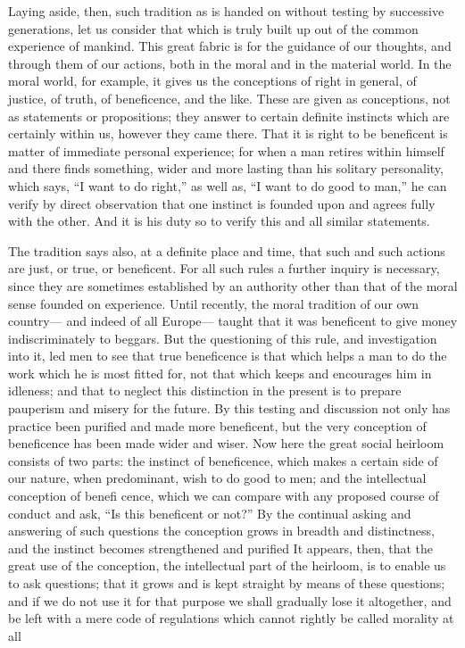 \documentclass[12pt]{article}
\begin{document}
Laying aside, then, such tradition as is handed on without testing by successive generations, let us consider that which is truly built up out of the common experience of mankind. This great fabric is for the guidance of our thoughts, and through them of our actions, both in the moral and in the material world. In the moral world, for example, it gives us the conceptions of right in general, of justice, of truth, of beneficence, and the like. These are given as conceptions, not as statements or propositions; they answer to certain definite instincts which are certainly within us, however they came there. That it is right to be beneficent is matter of immediate personal experience; for when a man retires within himself and there finds something, wider and more lasting than his solitary personality, which says, ``I want to do right,'' as well as, ``I want to do good to man,'' he can verify by direct observation that one instinct is founded upon and agrees fully with the other. And it is his duty so to verify this and all similar statements.

The tradition says also, at a definite place and time, that such and such actions are just, or true, or beneficent. For all such rules a further inquiry is necessary, since they are sometimes established by an authority other than that of the moral sense founded on experience. Until recently, the moral tradition of our own country--- and indeed of all Europe--- taught that it was beneficent to give money indiscriminately to beggars. But the questioning of this rule, and investigation into it, led men to see that true beneficence is that which helps a man to do the work which he is most fitted for, not that which keeps and encourages him in idleness; and that to neglect this distinction in the present is to prepare pauperism and misery for the future. By this testing and discussion not only has practice been purified and made more beneficent, but the very conception of beneficence has been made wider and wiser. Now here the great social heirloom consists of two parts: the instinct of beneficence, which makes a certain side of our nature, when predominant, wish to do good to men; and the intellectual conception of benefi cence, which we can compare with any proposed course of conduct and ask, ``Is this beneficent or not?'' By the continual asking and answering of such questions the conception grows in breadth and distinctness, and the instinct becomes strengthened and purified It appears, then, that the great use of the conception, the intellectual part of the heirloom, is to enable us to ask questions; that it grows and is kept straight by means of these questions; and if we do not use it for that purpose we shall gradually lose it altogether, and be left with a mere code of regulations which cannot rightly be called morality at all
\end{document}
